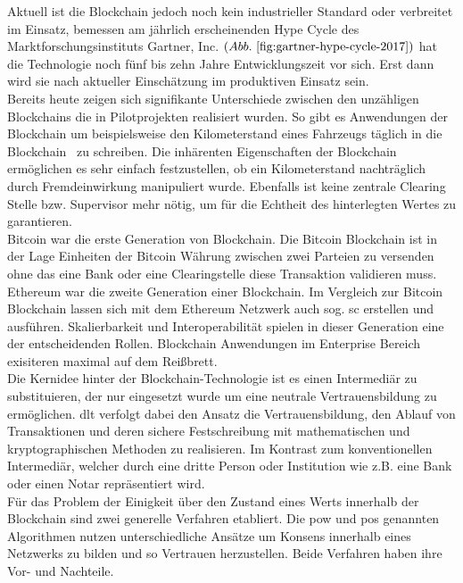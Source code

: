 Aktuell ist die Blockchain jedoch noch kein industrieller Standard oder verbreitet im Einsatz, bemessen am jährlich erscheinenden Hype Cycle des Marktforschungsinstituts Gartner, Inc. $( Abb.~ \ref{fig:gartner-hype-cycle-2017} )$ hat die Technologie noch fünf bis zehn Jahre Entwicklungszeit vor sich. Erst dann wird sie nach aktueller Einschätzung im produktiven Einsatz sein.\\

Bereits heute zeigen sich signifikante Unterschiede zwischen den unzähligen Blockchains die in Pilotprojekten realisiert wurden. So gibt es Anwendungen der Blockchain um beispielsweise den Kilometerstand eines Fahrzeugs täglich \glqq in die Blockchain\grqq~ zu schreiben. Die inhärenten Eigenschaften der Blockchain ermöglichen es sehr einfach festzustellen, ob ein Kilometerstand nachträglich durch Fremdeinwirkung manipuliert wurde. Ebenfalls ist keine zentrale \glqq Clearing Stelle\grqq{} bzw. Supervisor mehr nötig, um für die Echtheit des hinterlegten Wertes zu garantieren. \cite{carVertical}\\

Bitcoin war die erste Generation von Blockchain. Die Bitcoin Blockchain ist in der Lage Einheiten der Bitcoin Währung zwischen zwei Parteien zu versenden ohne das eine Bank oder eine Clearingstelle diese Transaktion validieren muss. \cite[vgl.]{Nakamoto2009} Ethereum war die zweite Generation einer Blockchain. Im Vergleich zur Bitcoin Blockchain lassen sich mit dem Ethereum Netzwerk auch sog. \ac{sc} erstellen und ausführen.\cite[vgl.]{Buterin2014} Skalierbarkeit und Interoperabilität spielen in dieser Generation eine der entscheidenden Rollen. \cite[vgl.]{Cardano} Blockchain Anwendungen im Enterprise Bereich exisiteren maximal auf dem Reißbrett.\\

Die Kernidee hinter der Blockchain-Technologie ist es einen Intermediär zu substituieren, der nur eingesetzt wurde um eine neutrale Vertrauensbildung zu ermöglichen. \ac{dlt} verfolgt dabei den Ansatz die Vertrauensbildung, den Ablauf von Transaktionen und deren sichere Festschreibung mit mathematischen und kryptographischen Methoden zu realisieren. Im Kontrast zum konventionellen Intermediär, welcher durch eine dritte Person oder Institution wie z.B. eine Bank oder einen Notar repräsentiert wird.\\

Für das Problem der Einigkeit über den Zustand eines Werts innerhalb der Blockchain sind zwei generelle Verfahren etabliert. Die \ac{pow} und \ac{pos} genannten Algorithmen nutzen unterschiedliche Ansätze um Konsens innerhalb eines Netzwerks zu bilden und so Vertrauen herzustellen. Beide Verfahren haben ihre Vor- und Nachteile.\\

